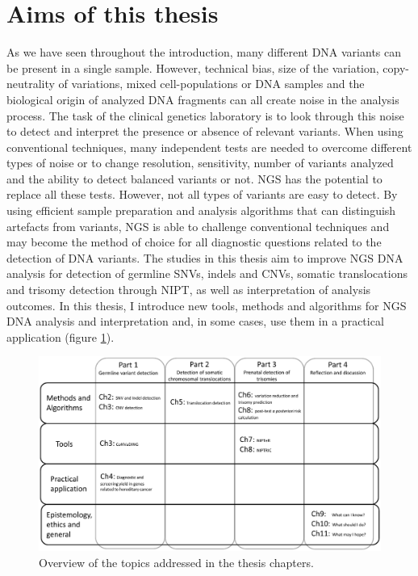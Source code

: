 \section {Aims of this thesis} \label{intro_aims}
As we have seen throughout the introduction, many different DNA variants can be present in a single sample. 
However, technical bias, size of the variation, copy-neutrality of variations, mixed cell-populations or DNA samples and the biological origin of analyzed DNA fragments can all create noise in the analysis process. 
The task of the clinical genetics laboratory is to look through this noise to detect and interpret the presence or absence of relevant variants. 
When using conventional techniques, many independent tests are needed to overcome different types of noise or to change resolution, sensitivity, number of variants analyzed and the ability to detect balanced variants or not. NGS has the potential to replace all these tests. 
However, not all types of variants are easy to detect. 
By using efficient sample preparation and analysis algorithms that can distinguish artefacts from variants, NGS is able to challenge conventional techniques and may become the method of choice for all diagnostic questions related to the detection of DNA variants.
The studies in this thesis aim to improve NGS DNA analysis for detection of germline SNVs, indels and CNVs, somatic translocations and trisomy detection through NIPT, as well as interpretation of analysis outcomes. 
In this thesis, I introduce new tools, methods and algorithms for NGS DNA analysis and interpretation and, in some cases, use them in a practical application (figure \ref{fig:Introduction_Fig3}). 

\begin{figure}
	\includegraphics[width=1.0\linewidth]{img/Introduction_Fig3}
	\caption[Overview of the topics addressed in the thesis chapters ]{Overview of the topics addressed in the thesis chapters.}
	\label{fig:Introduction_Fig3}
\end{figure}

